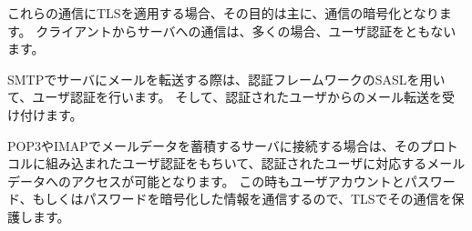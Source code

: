 これらの通信にTLSを適用する場合、その目的は主に、通信の暗号化となります。
クライアントからサーバへの通信は、多くの場合、ユーザ認証をともないます。

SMTPでサーバにメールを転送する際は、認証フレームワークのSASLを用いて、ユーザ認証を行います。
そして、認証されたユーザからのメール転送を受け付けます。

POP3やIMAPでメールデータを蓄積するサーバに接続する場合は、そのプロトコルに組み込まれたユーザ認証をもちいて、認証されたユーザに対応するメールデータへのアクセスが可能となります。
この時もユーザアカウントとパスワード、もしくはパスワードを暗号化した情報を通信するので、TLSでその通信を保護します。


